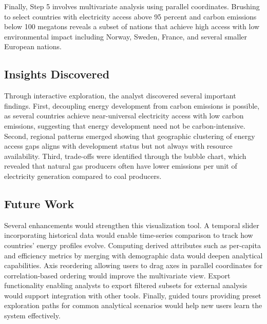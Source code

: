 \documentclass[conference]{IEEEtran}
\begin{document}
Finally, Step 5 involves multivariate analysis using parallel coordinates. Brushing to select countries with electricity access above 95 percent and carbon emissions below 100 megatons reveals a subset of nations that achieve high access with low environmental impact including Norway, Sweden, France, and several smaller European nations.

\subsection{Insights Discovered}
Through interactive exploration, the analyst discovered several important findings. First, decoupling energy development from carbon emissions is possible, as several countries achieve near-universal electricity access with low carbon emissions, suggesting that energy development need not be carbon-intensive. Second, regional patterns emerged showing that geographic clustering of energy access gaps aligns with development status but not always with resource availability. Third, trade-offs were identified through the bubble chart, which revealed that natural gas producers often have lower emissions per unit of electricity generation compared to coal producers.

\subsection{Future Work}
Several enhancements would strengthen this visualization tool. A temporal slider incorporating historical data would enable time-series comparison to track how countries' energy profiles evolve. Computing derived attributes such as per-capita and efficiency metrics by merging with demographic data would deepen analytical capabilities. Axis reordering allowing users to drag axes in parallel coordinates for correlation-based ordering would improve the multivariate view. Export functionality enabling analysts to export filtered subsets for external analysis would support integration with other tools. Finally, guided tours providing preset exploration paths for common analytical scenarios would help new users learn the system effectively.
\end{document}
